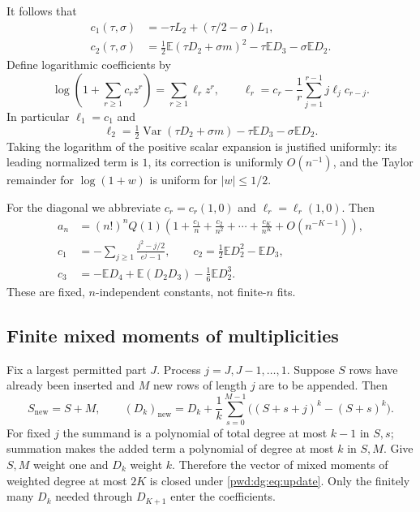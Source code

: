 \documentclass[11pt,letterpaper]{article}
\numberwithin{equation}{section}
\theoremstyle{remark}\newtheorem{remark}[theorem]{Remark}
\newcommand{\E}{\mathbb E}\newcommand{\Prob}{\mathbb P}
\DeclareMathOperator{\Var}{Var}
\begin{document}
It follows that
\begin{align}
 c_1(\tau,\sigma)&=-\tau L_2+(\tau/2-\sigma)L_1,\label{pwd:dg:eq:c1}\\
 c_2(\tau,\sigma)&=\tfrac12\E(\tau D_2+\sigma m)^2-\tau\E D_3-\sigma\E D_2.\label{pwd:dg:eq:c2}
\end{align}
Define logarithmic coefficients by
\begin{equation}\label{pwd:dg:eq:ell}
 \log\left(1+\sum_{r\ge1}c_rz^r\right)=\sum_{r\ge1}\ell_rz^r,
 \qquad
 \ell_r=c_r-\frac1r\sum_{j=1}^{r-1}j\ell_jc_{r-j}.
\end{equation}
In particular $\ell_1=c_1$ and
\begin{equation}\label{pwd:dg:eq:ell2}
 \ell_2=\tfrac12\Var(\tau D_2+\sigma m)-\tau\E D_3-\sigma\E D_2.
\end{equation}
Taking the logarithm of the positive scalar expansion is justified uniformly: its leading normalized term is $1$, its correction is uniformly $O(n^{-1})$, and the Taylor remainder for $\log(1+w)$ is uniform for $|w|\le1/2$.

For the diagonal we abbreviate $c_r=c_r(1,0)$ and $\ell_r=\ell_r(1,0)$. Then
\begin{align}
 a_n&=(n!)^nQ(1)\left(1+\frac{c_1}{n}+\frac{c_2}{n^2}+\cdots+\frac{c_K}{n^K}
                              +O(n^{-K-1})\right),\label{pwd:dg:eq:diagseries}\\
 c_1&=-\sum_{j\ge1}\frac{j^2-j/2}{e^j-1},\qquad
 c_2=\tfrac12\E D_2^2-\E D_3,\label{pwd:dg:eq:diagcoeff}\\
 c_3&=-\E D_4+\E(D_2D_3)-\tfrac16\E D_2^3.\nonumber
\end{align}
These are fixed, $n$-independent constants, not finite-$n$ fits.

\subsection{Finite mixed moments of multiplicities}\label{pwd:dg:sec:momentengine}
Fix a largest permitted part $J$. Process $j=J,J-1,\ldots,1$. Suppose $S$ rows have already been inserted and $M$ new rows of length $j$ are to be appended. Then
\begin{equation}\label{pwd:dg:eq:update}
 S_{\mathrm{new}}=S+M,\qquad
 (D_k)_{\mathrm{new}}=D_k+\frac1k\sum_{s=0}^{M-1}\bigl((S+s+j)^k-(S+s)^k\bigr).
\end{equation}
For fixed $j$ the summand is a polynomial of total degree at most $k-1$ in $S,s$; summation makes the added term a polynomial of degree at most $k$ in $S,M$. Give $S,M$ weight one and $D_k$ weight $k$. Therefore the vector of mixed moments of weighted degree at most $2K$ is closed under \eqref{pwd:dg:eq:update}. Only the finitely many $D_k$ needed through $D_{K+1}$ enter the coefficients.
\end{document}
